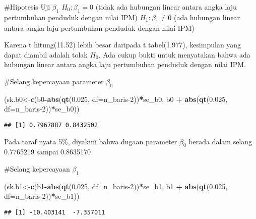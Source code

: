 \documentclass[
]{article}
\newenvironment{Shaded}{\begin{snugshade}}{\end{snugshade}}
\newcommand{\AttributeTok}[1]{\textcolor[rgb]{0.13,0.29,0.53}{#1}}
\newcommand{\DecValTok}[1]{\textcolor[rgb]{0.00,0.00,0.81}{#1}}
\newcommand{\FloatTok}[1]{\textcolor[rgb]{0.00,0.00,0.81}{#1}}
\newcommand{\FunctionTok}[1]{\textcolor[rgb]{0.13,0.29,0.53}{\textbf{#1}}}
\newcommand{\NormalTok}[1]{#1}
\newcommand{\OtherTok}[1]{\textcolor[rgb]{0.56,0.35,0.01}{#1}}
\newcommand{\SpecialCharTok}[1]{\textcolor[rgb]{0.81,0.36,0.00}{\textbf{#1}}}
\begin{document}
\#Hipotesis Uji \(\beta_1\) \(H_0:\beta_1=0\) (tidak ada hubungan linear
antara angka laju pertumbuhan penduduk dengan nilai IPM)
\(H_1:\beta_1≠0\) (ada hubungan linear antara angka laju pertumbuhan
penduduk dengan nilai IPM)

Karena t hitung(11.52) lebih besar daripada t tabel(1.977), kesimpulan
yang dapat diambil adalah tolak \(H_0\). Ada cukup bukti untuk
menyatakan bahwa ada hubungan linear antara angka laju pertumbuhan
penduduk dengan nilai IPM.

\#Selang kepercayaan parameter \(\beta_0\)

\begin{Shaded}
\begin{Highlighting}[]
\NormalTok{(sk.b0}\OtherTok{\textless{}{-}}\FunctionTok{c}\NormalTok{(b0}\SpecialCharTok{{-}}\FunctionTok{abs}\NormalTok{(}\FunctionTok{qt}\NormalTok{(}\FloatTok{0.025}\NormalTok{, }\AttributeTok{df=}\NormalTok{n\_baris}\DecValTok{{-}2}\NormalTok{))}\SpecialCharTok{*}\NormalTok{se\_b0, b0 }\SpecialCharTok{+} \FunctionTok{abs}\NormalTok{(}\FunctionTok{qt}\NormalTok{(}\FloatTok{0.025}\NormalTok{, }\AttributeTok{df=}\NormalTok{n\_baris}\DecValTok{{-}2}\NormalTok{))}\SpecialCharTok{*}\NormalTok{se\_b0))}
\end{Highlighting}
\end{Shaded}

\begin{verbatim}
## [1] 0.7967887 0.8432502
\end{verbatim}

Pada taraf nyata 5\%, diyakini bahwa dugaan parameter \(\beta_0\) berada
dalam selang 0.7765219 sampai 0.8635170

\#Selang kepercayaan \(\beta_1\)

\begin{Shaded}
\begin{Highlighting}[]
\NormalTok{(sk.b1}\OtherTok{\textless{}{-}}\FunctionTok{c}\NormalTok{(b1}\SpecialCharTok{{-}}\FunctionTok{abs}\NormalTok{(}\FunctionTok{qt}\NormalTok{(}\FloatTok{0.025}\NormalTok{, }\AttributeTok{df=}\NormalTok{n\_baris}\DecValTok{{-}2}\NormalTok{))}\SpecialCharTok{*}\NormalTok{se\_b1, b1 }\SpecialCharTok{+} \FunctionTok{abs}\NormalTok{(}\FunctionTok{qt}\NormalTok{(}\FloatTok{0.025}\NormalTok{, }\AttributeTok{df=}\NormalTok{n\_baris}\DecValTok{{-}2}\NormalTok{))}\SpecialCharTok{*}\NormalTok{se\_b1))}
\end{Highlighting}
\end{Shaded}

\begin{verbatim}
## [1] -10.403141  -7.357011
\end{verbatim}
\end{document}
